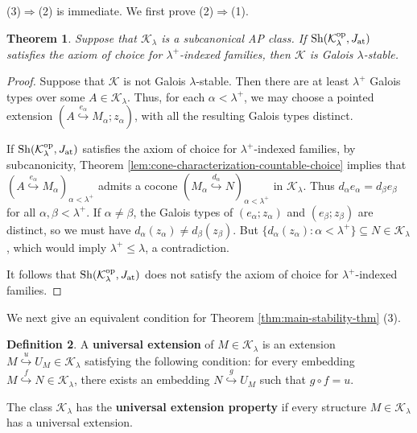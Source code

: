 \documentclass[10pt]{amsart}
\numberwithin{equation}{section}
\theoremstyle{plain}
\newtheorem{theorem}{Theorem}[section]
\theoremstyle{definition}
\newtheorem{definition}[theorem]{Definition}
\newcommand{\K}{\mathcal{K}}
\newcommand{\embed}{\hookrightarrow}
\newcommand{\embedge}[1]{\overset{#1}{\embed}}
\newcommand{\com}[1]{
\color{magenta}\emph{#1}
\color{black}}
\begin{document}

(3)$\Rightarrow$(2) is immediate.
We first prove (2)$\Rightarrow$(1).

\begin{theorem}\label{thm:choice-implies-stability}
Suppose that $\K_\lambda$ is a subcanonical AP class.
If ${\rm Sh}(\K^{\rm op}_\lambda,J_{\rm at})$ satisfies the axiom of choice for $\lambda^+$-indexed families, then $\K$ is Galois $\lambda$-stable.
\end{theorem}

\begin{proof}
Suppose that $\K$ is not Galois $\lambda$-stable.
Then there are at least $\lambda^+$ Galois types over some $A\in\K_\lambda$.
Thus, for each $\alpha<\lambda^+$, we may choose a pointed extension $(A\embedge{e_\alpha}M_\alpha;z_\alpha)$, with all the resulting Galois types distinct.


If ${\rm Sh}(\K_\lambda^{\rm op},J_{\rm at})$ satisfies the axiom of choice for $\lambda^+$-indexed families, by subcanonicity, Theorem \ref{lem:cone-characterization-countable-choice} implies that $(A\embedge{e_\alpha}M_\alpha)_{\alpha<\lambda^+}$ admits a cocone $(M_\alpha\embedge{d_\alpha}N)_{\alpha<\lambda^+}$ in $\K_\lambda$.
Thus $d_\alpha e_\alpha=d_\beta e_\beta$ for all $\alpha,\beta<\lambda^+$.
If $\alpha\not=\beta$, the Galois types of $(e_\alpha;z_\alpha)$ and $(e_\beta;z_\beta)$ are distinct, so we must have $d_\alpha(z_\alpha)\not=d_\beta(z_\beta)$.
But $\{d_\alpha(z_\alpha):\alpha<\lambda^+\}\subseteq N\in\K_\lambda$, which would imply $\lambda^+\leq\lambda$, a contradiction.

It follows that ${\rm Sh}(\K_\lambda^{\rm op},J_{\rm at})$ does not satisfy the axiom of choice for $\lambda^+$-indexed families.
\end{proof}

We next give an equivalent condition for Theorem \ref{thm:main-stability-thm} (3).

\begin{definition}\label{def:universal-extension-prop}
A {\bf universal extension} of $M\in\K_\lambda$ is an extension $M\embedge{u} U_M\in\K_\lambda$ satisfying the following condition:
for every embedding $M\embedge{f} N\in\K_\lambda$, there exists an embedding $N\embedge{g} U_M$ such that $g\circ f=u$.

The class $\K_\lambda$ has the {\bf universal extension property} if every structure $M\in\K_\lambda$ has a universal extension.
\end{definition}
\end{document}
